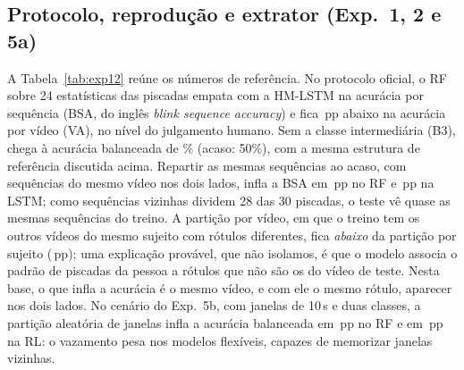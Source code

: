 \documentclass[conference]{IEEEtran}
\begin{document}
\subsection{Protocolo, reprodução e extrator (Exp.~1, 2 e 5a)}
A Tabela~\ref{tab:exp12} reúne os números de referência. No protocolo oficial, o RF sobre 24 estatísticas das piscadas empata com a HM-LSTM na acurácia por sequência (BSA, do inglês \emph{blink sequence accuracy}) e fica \ExpUmDifHMLSTMRFVA\,pp abaixo na acurácia por vídeo (VA), no nível do julgamento humano. Sem a classe intermediária (B3), chega à acurácia balanceada de \ExpUmRFBTresAcBal\% (acaso: 50\%), com a mesma estrutura de referência discutida acima. Repartir as mesmas sequências ao acaso, com sequências do mesmo vídeo nos dois lados, infla a BSA em \ExpDoisRFInflacaoJanelaBSA\,pp no RF e \ExpDoisLSTMInflacaoJanelaBSA\,pp na LSTM; como sequências vizinhas dividem 28 das 30 piscadas, o teste vê quase as mesmas sequências do treino. A partição por vídeo, em que o treino tem os outros vídeos do mesmo sujeito com rótulos diferentes, fica \emph{abaixo} da partição por sujeito (\ExpDoisRFInflacaoVideoBSA\,pp); uma explicação provável, que não isolamos, é que o modelo associa o padrão de piscadas da pessoa a rótulos que não são os do vídeo de teste. Nesta base, o que infla a acurácia é o mesmo vídeo, e com ele o mesmo rótulo, aparecer nos dois lados. No cenário do Exp.~5b, com janelas de 10\,s e duas classes, a partição aleatória de janelas infla a acurácia balanceada em \ExpCincoBVazamentoAcBal\,pp no RF e em \ExpCincoBLRVazamentoAcBal\,pp na RL: o vazamento pesa nos modelos flexíveis, capazes de memorizar janelas vizinhas.
\end{document}
